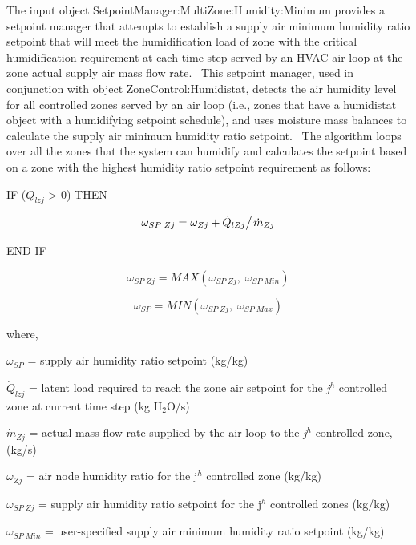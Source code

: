 The input object SetpointManager:MultiZone:Humidity:Minimum provides a setpoint manager that attempts to establish a supply air minimum humidity ratio setpoint that will meet the humidification load of zone with the critical humidification requirement at each time step served by an HVAC air loop at the zone actual supply air mass flow rate.~ This setpoint manager, used in conjunction with object ZoneControl:Humidistat, detects the air humidity level for all controlled zones served by an air loop (i.e., zones that have a humidistat object with a humidifying setpoint schedule), and uses moisture mass balances to calculate the supply air minimum humidity ratio setpoint.~ The algorithm loops over all the zones that the system can humidify and calculates the setpoint based on a zone with the highest humidity ratio setpoint requirement as follows:

IF (\({\dot Q_{lzj}}\) \textgreater{} 0) THEN

\begin{equation}
{\omega_{SP\;Zj}} = {\omega_{Zj}} + {{{{\dot Q}_{lZj}}} \mathord{\left/ {\vphantom {{{{\dot Q}_{lZj}}} {{{\dot m}_{Zj}}}}} \right. } {{{\dot m}_{Zj}}}}
\end{equation}

END IF

\begin{equation}
{\omega_{SP\;Zj}} = MAX\left( {{\omega_{SP\;Zj}},\;{\omega_{SP\;Min}}} \right)
\end{equation}

\begin{equation}
{\omega_{SP}} = MIN\left( {{\omega_{SP\;Zj}},\;{\omega_{SP\;Max}}} \right)
\end{equation}

where,

\({\omega_{SP}}\) = supply air humidity ratio setpoint (kg/kg)

\({\dot Q_{lzj}}\) = latent load required to reach the zone air setpoint for the \emph{j}\(^{h}\) controlled zone at current time step (kg H\(_{2}\)O/s)

\({\dot m_{Zj}}\) = actual mass flow rate supplied by the air loop to the \emph{j}\(^{h}\) controlled zone, (kg/s)

\({\omega_{Zj}}\) = air node humidity ratio for the j\(^{h}\) controlled zone (kg/kg)

\({\omega_{SP\;Zj}}\) = supply air humidity ratio setpoint for the j\(^{h}\) controlled zones (kg/kg)

\({\omega_{SP\;Min}}\) = user-specified supply air minimum humidity ratio setpoint (kg/kg)

